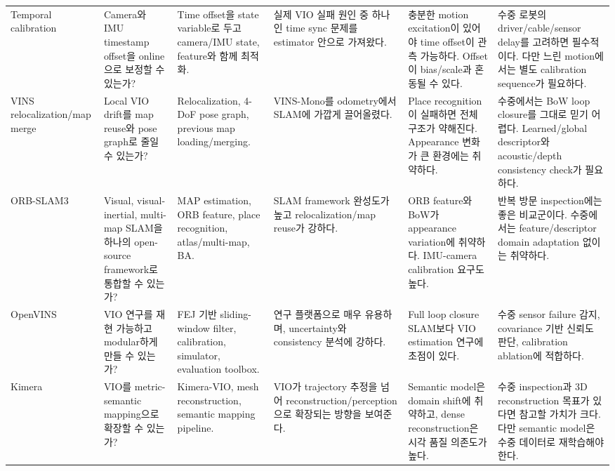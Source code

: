 \documentclass[11pt,a4paper]{article}
\begin{document}
\begin{landscape}
\begin{longtable}{p{29mm}p{34mm}p{38mm}p{42mm}p{42mm}p{44mm}}
Temporal calibration \cite{qin2018temporal}
& Camera와 IMU timestamp offset을 online으로 보정할 수 있는가?
& Time offset을 state variable로 두고 camera/IMU state, feature와 함께 최적화.
& 실제 VIO 실패 원인 중 하나인 time sync 문제를 estimator 안으로 가져왔다.
& 충분한 motion excitation이 있어야 time offset이 관측 가능하다. Offset이 bias/scale과 혼동될 수 있다.
& 수중 로봇의 driver/cable/sensor delay를 고려하면 필수적이다. 다만 느린 motion에서는 별도 calibration sequence가 필요하다. \\

VINS relocalization/map merge \cite{qin2018relocalization}
& Local VIO drift를 map reuse와 pose graph로 줄일 수 있는가?
& Relocalization, 4-DoF pose graph, previous map loading/merging.
& VINS-Mono를 odometry에서 SLAM에 가깝게 끌어올렸다.
& Place recognition이 실패하면 전체 구조가 약해진다. Appearance 변화가 큰 환경에는 취약하다.
& 수중에서는 BoW loop closure를 그대로 믿기 어렵다. Learned/global descriptor와 acoustic/depth consistency check가 필요하다. \\

ORB-SLAM3 \cite{campos2021orbslam3}
& Visual, visual-inertial, multi-map SLAM을 하나의 open-source framework로 통합할 수 있는가?
& MAP estimation, ORB feature, place recognition, atlas/multi-map, BA.
& SLAM framework 완성도가 높고 relocalization/map reuse가 강하다.
& ORB feature와 BoW가 appearance variation에 취약하다. IMU-camera calibration 요구도 높다.
& 반복 방문 inspection에는 좋은 비교군이다. 수중에서는 feature/descriptor domain adaptation 없이는 취약하다. \\

OpenVINS \cite{geneva2020openvins}
& VIO 연구를 재현 가능하고 modular하게 만들 수 있는가?
& FEJ 기반 sliding-window filter, calibration, simulator, evaluation toolbox.
& 연구 플랫폼으로 매우 유용하며, uncertainty와 consistency 분석에 강하다.
& Full loop closure SLAM보다 VIO estimation 연구에 초점이 있다.
& 수중 sensor failure 감지, covariance 기반 신뢰도 판단, calibration ablation에 적합하다. \\

Kimera \cite{rosinol2020kimera}
& VIO를 metric-semantic mapping으로 확장할 수 있는가?
& Kimera-VIO, mesh reconstruction, semantic mapping pipeline.
& VIO가 trajectory 추정을 넘어 reconstruction/perception으로 확장되는 방향을 보여준다.
& Semantic model은 domain shift에 취약하고, dense reconstruction은 시각 품질 의존도가 높다.
& 수중 inspection과 3D reconstruction 목표가 있다면 참고할 가치가 크다. 다만 semantic model은 수중 데이터로 재학습해야 한다. \\


\end{longtable}
\end{landscape}
\end{document}
